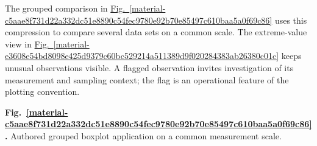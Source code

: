 \documentclass[11pt,a4paper]{article}
\begin{document}
The grouped comparison in \hyperref[material-c5aae8f731d22a332dc51e8890c54fec9780e92b70e85497c610baa5a0f69c86]{Fig.~\ref*{material-c5aae8f731d22a332dc51e8890c54fec9780e92b70e85497c610baa5a0f69c86}} uses this compression to compare several data sets on a common scale. The extreme-value view in \hyperref[material-e3608e54bd8098e425d9379c60bc529214a511389d9f020284383ab26380c01c]{Fig.~\ref*{material-e3608e54bd8098e425d9379c60bc529214a511389d9f020284383ab26380c01c}} keeps unusual observations visible. A flagged observation invites investigation of its measurement and sampling context; the flag is an operational feature of the plotting convention.


\par\medskip
\Needspace{10cm}
\label{material-c5aae8f731d22a332dc51e8890c54fec9780e92b70e85497c610baa5a0f69c86}
\noindent\textbf{Fig.~\ref*{material-c5aae8f731d22a332dc51e8890c54fec9780e92b70e85497c610baa5a0f69c86}.} Authored grouped boxplot application on a common measurement scale.\par\nopagebreak
\end{document}
